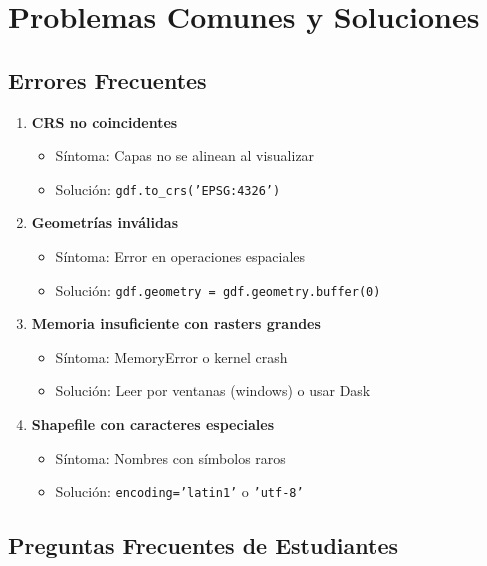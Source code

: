 \documentclass[11pt,a4paper]{article}
\begin{document}
\newpage

\section{Problemas Comunes y Soluciones}

\subsection{Errores Frecuentes}

\begin{enumerate}
    \item \textbf{CRS no coincidentes}
    \begin{itemize}
        \item Síntoma: Capas no se alinean al visualizar
        \item Solución: \texttt{gdf.to\_crs('EPSG:4326')}
    \end{itemize}
    
    \item \textbf{Geometrías inválidas}
    \begin{itemize}
        \item Síntoma: Error en operaciones espaciales
        \item Solución: \texttt{gdf.geometry = gdf.geometry.buffer(0)}
    \end{itemize}
    
    \item \textbf{Memoria insuficiente con rasters grandes}
    \begin{itemize}
        \item Síntoma: MemoryError o kernel crash
        \item Solución: Leer por ventanas (windows) o usar Dask
    \end{itemize}
    
    \item \textbf{Shapefile con caracteres especiales}
    \begin{itemize}
        \item Síntoma: Nombres con símbolos raros
        \item Solución: \texttt{encoding='latin1'} o \texttt{'utf-8'}
    \end{itemize}
\end{enumerate}

\subsection{Preguntas Frecuentes de Estudiantes}
\end{document}
